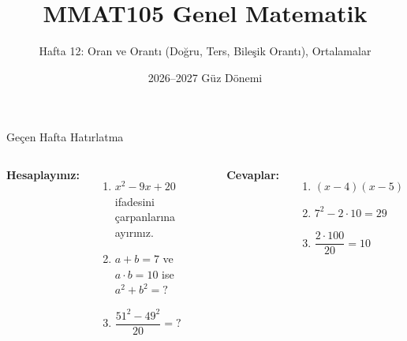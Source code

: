 \documentclass[aspectratio=169,11pt,handout]{beamer}
\title[MMAT105 -- Hafta 12]{MMAT105 Genel Matematik}
\subtitle{Hafta 12: Oran ve Orantı (Doğru, Ters, Bileşik Orantı), Ortalamalar}
\author{}
\date{2026--2027 Güz Dönemi}
\begin{document}
\begin{frame}
\titlepage
\end{frame}


\begin{frame}{Geçen Hafta Hatırlatma}
\begin{columns}[t]
\textbf{Hesaplayınız:}
\begin{enumerate}
\item \(x^2-9x+20\) ifadesini çarpanlarına ayırınız.
\item \(a+b=7\) ve \(a\cdot b=10\) ise \(a^2+b^2=?\)
\item \(\dfrac{51^2-49^2}{20}=?\)
\end{enumerate}
\pause
\textbf{Cevaplar:}
\begin{enumerate}
\item \((x-4)(x-5)\)
\item \(7^2-2\cdot 10=29\)
\item \(\dfrac{2\cdot 100}{20}=10\)
\end{enumerate}
\end{columns}
\end{frame}
\end{document}
